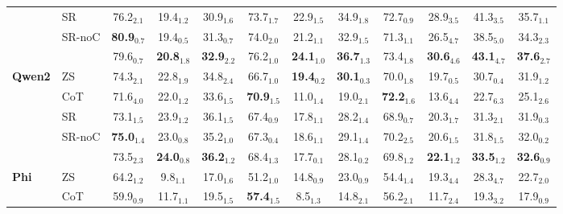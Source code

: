 \begin{table*}[!t]
\begin{tabular}{ll|cc>{\columncolor[gray]{0.9}}c|cc>{\columncolor[gray]{0.9}}c|cc>{\columncolor[gray]{0.9}}c|c}
& SR  & 
76.2$_{2.1}$ & 19.4$_{1.2}$ & 30.9$_{1.6}$ & 
73.7$_{1.7}$ & 22.9$_{1.5}$ & 34.9$_{1.8}$ & 
72.7$_{0.9}$ & 28.9$_{3.5}$ & 41.3$_{3.5}$ & 35.7$_\text{1.1}$\\

& SR-noC  & 
\textbf{80.9}$_{0.7}$ & 19.4$_{0.5}$ & 31.3$_{0.7}$ & 
74.0$_{2.0}$ & 21.2$_{1.1}$ & 32.9$_{1.5}$ & 
71.3$_{1.1}$ & 26.5$_{4.7}$ & 38.5$_{5.0}$ & 34.3$_\text{2.3}$\\

& \method{}  & 
79.6$_{0.7}$ & \textbf{20.8}$_{1.8}$ & \textbf{32.9}$_{2.2}$ & 
76.2$_{1.0}$ & \textbf{24.1}$_{1.0}$ & \textbf{36.7}$_{1.3}$ & 
73.4$_{1.8}$ & \textbf{30.6}$_{4.6}$ & \textbf{43.1}$_{4.7}$ & \textbf{37.6}$_\text{2.7}$\\ \midrule

\multirow{5}{*}{\textbf{Qwen2}} & 
ZS  & 
74.3$_{2.1}$ & 22.8$_{1.9}$ & 34.8$_{2.4}$ & 
66.7$_{1.0}$ & \textbf{19.4}$_{0.2}$ & \textbf{30.1}$_{0.3}$ & 
70.0$_{1.8}$ & 19.7$_{0.5}$ & 30.7$_{0.4}$ & 31.9$_\text{1.2}$\\

& CoT  & 
71.6$_{4.0}$ & 22.0$_{1.2}$ & 33.6$_{1.5}$ & 
\textbf{70.9}$_{1.5}$ & 11.0$_{1.4}$ & 19.0$_{2.1}$ & 
\textbf{72.2}$_{1.6}$ & 13.6$_{4.4}$ & 22.7$_{6.3}$ & 25.1$_\text{2.6}$\\

& SR  & 
73.1$_{1.5}$ & 23.9$_{1.2}$ & 36.1$_{1.5}$ & 
67.4$_{0.9}$ & 17.8$_{1.1}$ & 28.2$_{1.4}$ & 
68.9$_{0.7}$ & 20.3$_{1.7}$ & 31.3$_{2.1}$ & 31.9$_\text{0.3}$\\

& SR-noC  & 
\textbf{75.0}$_{1.4}$ & 23.0$_{0.8}$ & 35.2$_{1.0}$ & 
67.3$_{0.4}$ & 18.6$_{1.1}$ & 29.1$_{1.4}$ & 
70.2$_{2.5}$ & 20.6$_{1.5}$ & 31.8$_{1.5}$ & 32.0$_\text{0.2}$\\

& \method{}  & 
73.5$_{2.3}$ & \textbf{24.0}$_{0.8}$ & \textbf{36.2}$_{1.2}$ & 
68.4$_{1.3}$ & 17.7$_{0.1}$ & 28.1$_{0.2}$ & 
69.8$_{1.2}$ & \textbf{22.1}$_{1.2}$ & \textbf{33.5}$_{1.2}$ & \textbf{32.6}$_\text{0.9}$\\ \midrule

\multirow{5}{*}{\textbf{Phi}} & 
ZS  & 
64.2$_{1.2}$ & 9.8$_{1.1}$ & 17.0$_{1.6}$ & 
51.2$_{1.0}$ & 14.8$_{0.9}$ & 23.0$_{0.9}$ & 
54.4$_{1.4}$ & 19.3$_{4.4}$ & 28.3$_{4.7}$ & 22.7$_\text{2.0}$\\

& CoT  & 
59.9$_{0.9}$ & 11.7$_{1.1}$ & 19.5$_{1.5}$ & 
\textbf{57.4}$_{1.5}$ & 8.5$_{1.3}$ & 14.8$_{2.1}$ & 
56.2$_{2.1}$ & 11.7$_{2.4}$ & 19.3$_{3.2}$ & 17.9$_\text{0.9}$\\


\end{tabular}
\end{table*}
